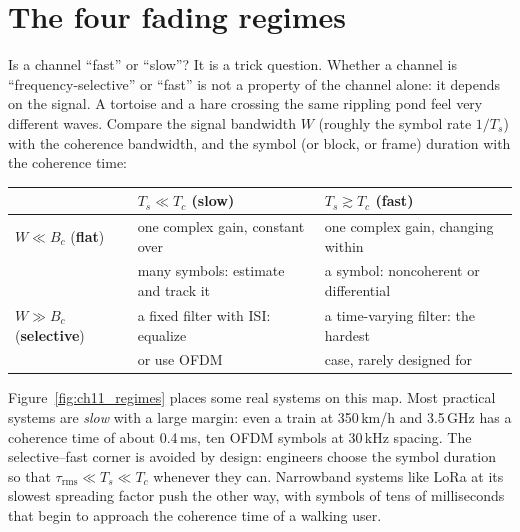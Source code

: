 
\section{The four fading regimes}
\label{sec:ch11:regimes}

Is a channel ``fast'' or ``slow''? It is a trick question. Whether a channel is
``frequency-selective'' or ``fast'' is not a property of the channel alone: it depends on the
signal. A tortoise and a hare crossing the same rippling pond feel very different waves. Compare
the signal bandwidth $W$ (roughly the symbol rate $1/T_s$) with the coherence bandwidth, and the
symbol (or block, or frame) duration with the coherence time:

\begin{center}\small
\begin{tabular}{@{}lll@{}}
\toprule
 & $T_s\ll T_c$ (\textbf{slow}) & $T_s\gtrsim T_c$ (\textbf{fast})\\
\midrule
$W\ll B_c$ (\textbf{flat}) & one complex gain, constant over & one complex gain, changing within\\
 & many symbols: estimate and track it & a symbol: noncoherent or differential\\
$W\gg B_c$ (\textbf{selective}) & a fixed filter with ISI: equalize & a time-varying filter: the hardest\\
 & or use OFDM & case, rarely designed for\\
\bottomrule
\end{tabular}
\end{center}

Figure~\ref{fig:ch11_regimes} places some real systems on this map. Most practical systems are
\emph{slow} with a large margin: even a train at 350\,km/h and 3.5\,GHz has a coherence time of about
0.4\,ms, ten OFDM symbols at 30\,kHz spacing. The selective--fast corner is avoided by design:
engineers choose the symbol duration so that $\tau_{\text{rms}}\ll T_s\ll T_c$ whenever they can.
Narrowband systems like LoRa at its slowest spreading factor push the other way, with symbols of
tens of milliseconds that begin to approach the coherence time of a walking user.

